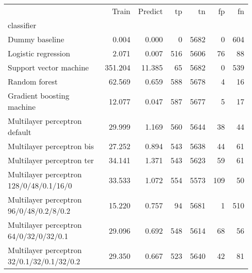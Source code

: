 \begin{tabular}{lrrrrrr}
\toprule
 & Train & Predict & tp & tn & fp & fn \\
classifier &  &  &  &  &  &  \\
\midrule
Dummy baseline & 0.004 & 0.000 & 0 & 5682 & 0 & 604 \\
Logistic regression & 2.071 & 0.007 & 516 & 5606 & 76 & 88 \\
Support vector machine & 351.204 & 11.385 & 65 & 5682 & 0 & 539 \\
Random forest & 62.569 & 0.659 & 588 & 5678 & 4 & 16 \\
Gradient boosting machine & 12.077 & 0.047 & 587 & 5677 & 5 & 17 \\
Multilayer perceptron default & 29.999 & 1.169 & 560 & 5644 & 38 & 44 \\
Multilayer perceptron bis & 27.252 & 0.894 & 543 & 5638 & 44 & 61 \\
Multilayer perceptron ter & 34.141 & 1.371 & 543 & 5623 & 59 & 61 \\
Multilayer perceptron 128/0/48/0.1/16/0 & 33.533 & 1.072 & 554 & 5573 & 109 & 50 \\
Multilayer perceptron 96/0/48/0.2/8/0.2 & 15.220 & 0.757 & 94 & 5681 & 1 & 510 \\
Multilayer perceptron 64/0/32/0/32/0.1 & 29.096 & 0.692 & 548 & 5614 & 68 & 56 \\
Multilayer perceptron 32/0.1/32/0.1/32/0.2 & 29.350 & 0.667 & 523 & 5640 & 42 & 81 \\
\bottomrule
\end{tabular}
